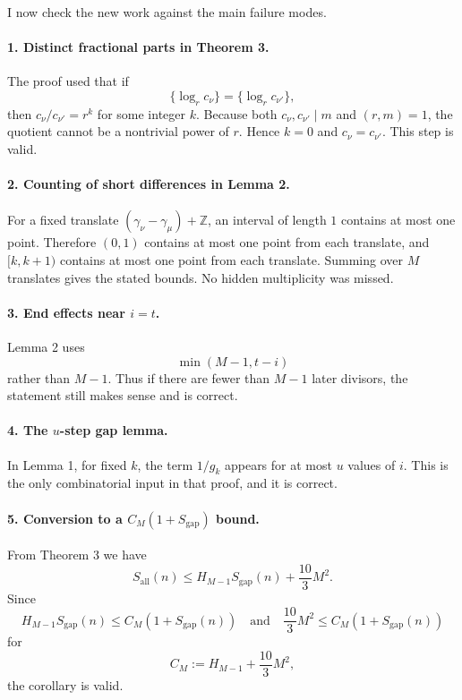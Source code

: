 I now check the new work against the main failure modes.

\paragraph{1. Distinct fractional parts in Theorem 3.}
The proof used that if
\[
\{\log_r c_\nu\}=\{\log_r c_{\nu'}\},
\]
then \(c_\nu/c_{\nu'}=r^k\) for some integer \(k\). Because both \(c_\nu,c_{\nu'}\mid m\) and \((r,m)=1\), the quotient cannot be a nontrivial power of \(r\). Hence \(k=0\) and \(c_\nu=c_{\nu'}\). This step is valid.

\paragraph{2. Counting of short differences in Lemma 2.}
For a fixed translate \((\gamma_\nu-\gamma_\mu)+\mathbb Z\), an interval of length \(1\) contains at most one point. Therefore \((0,1)\) contains at most one point from each translate, and \([k,k+1)\) contains at most one point from each translate. Summing over \(M\) translates gives the stated bounds. No hidden multiplicity was missed.

\paragraph{3. End effects near \(i=t\).}
Lemma 2 uses
\[
\min(M-1,t-i)
\]
rather than \(M-1\). Thus if there are fewer than \(M-1\) later divisors, the statement still makes sense and is correct.

\paragraph{4. The \(u\)-step gap lemma.}
In Lemma 1, for fixed \(k\), the term \(1/g_k\) appears for at most \(u\) values of \(i\). This is the only combinatorial input in that proof, and it is correct.

\paragraph{5. Conversion to a \(C_M(1+S_{\mathrm{gap}})\) bound.}
From Theorem 3 we have
\[
S_{\mathrm{all}}(n)\leq H_{M-1}S_{\mathrm{gap}}(n)+\frac{10}{3}M^2.
\]
Since
\[
H_{M-1}S_{\mathrm{gap}}(n)\leq C_M(1+S_{\mathrm{gap}}(n))
\quad\text{and}\quad
\frac{10}{3}M^2\leq C_M(1+S_{\mathrm{gap}}(n))
\]
for
\[
C_M:=H_{M-1}+\frac{10}{3}M^2,
\]
the corollary is valid.

